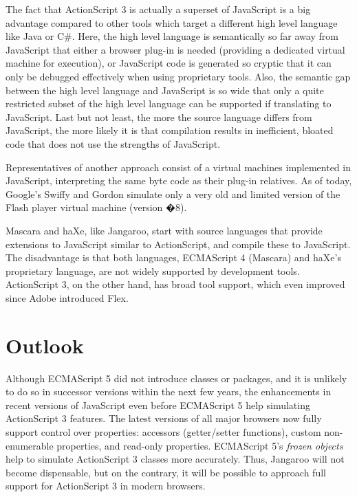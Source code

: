 \documentclass[11pt]{sigplanconf}
\begin{document}
The fact that ActionScript 3 is actually a superset of JavaScript is a big advantage compared to other tools which target a different high level language like Java or C\#. Here, the high level language is semantically so far away from JavaScript that either a browser plug-in is needed (providing a dedicated virtual machine for execution), or JavaScript code is generated so cryptic that it can only be debugged effectively when using proprietary tools. Also, the semantic gap between the high level language and JavaScript is so wide that only a quite restricted subset of the high level language can be supported if translating to JavaScript. Last but not least, the more the source language differs from JavaScript, the more likely it is that compilation results in inefficient, bloated code that does not use the strengths of JavaScript.

Representatives of another approach consist of a virtual machines implemented in JavaScript, interpreting the same byte code as their plug-in relatives. As of today, Google's Swiffy\citep{swiffy} and Gordon\citep{gordon} simulate only a very old and limited version of the Flash player virtual machine (version �8). 

Mascara\citep{mascara} and haXe\citep{haxe}, like Jangaroo, start with source languages that provide extensions to JavaScript similar to ActionScript, and compile these to Java\-Script. The disadvantage is that both languages,  ECMAScript 4 (Mascara) and haXe's proprietary language, are not widely supported by development tools. ActionScript 3, on the other hand, has broad tool support, which even improved since Adobe introduced Flex\citep{flex}. 

\section{Outlook}

Although ECMAScript 5 did not introduce classes or packages, and it is unlikely to do so in successor versions within the next few years, the enhancements in recent versions of JavaScript even before ECMAScript 5 help simulating ActionScript 3 features. The latest versions of all major browsers now fully support control over properties: accessors (getter/setter functions), custom non-enumerable properties, and read-only properties. ECMAScript 5's \emph{frozen objects} help to simulate ActionScript 3 classes more accurately. Thus, Jangaroo will not become dispensable, but on the contrary, it will be possible to approach full support for ActionScript 3 in modern browsers. 
\end{document}
